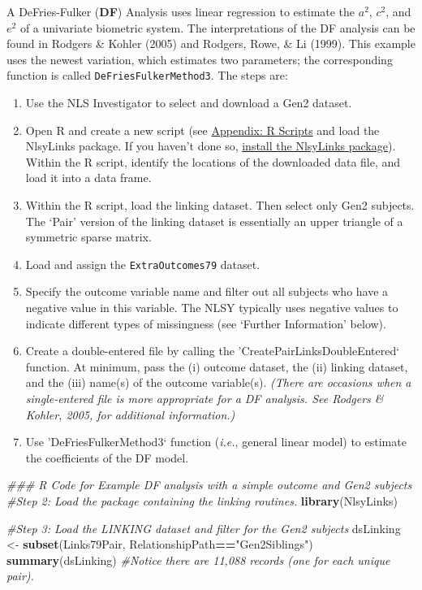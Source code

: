 \documentclass[smallextended]{svjour3}       %
\newenvironment{Shaded}{\begin{snugshade}}{\end{snugshade}}
\newcommand{\CommentTok}[1]{\textcolor[rgb]{0.56,0.35,0.01}{\textit{#1}}}
\newcommand{\KeywordTok}[1]{\textcolor[rgb]{0.13,0.29,0.53}{\textbf{#1}}}
\newcommand{\NormalTok}[1]{#1}
\newcommand{\OperatorTok}[1]{\textcolor[rgb]{0.81,0.36,0.00}{\textbf{#1}}}
\newcommand{\StringTok}[1]{\textcolor[rgb]{0.31,0.60,0.02}{#1}}
\begin{document}
A DeFries-Fulker (\textbf{DF}) Analysis uses linear regression to
estimate the \(a^2\), \(c^2\), and \(e^2\) of a univariate biometric
system. The interpretations of the DF analysis can be found in Rodgers
\& Kohler (2005) and Rodgers, Rowe, \& Li (1999). This example uses the
newest variation, which estimates two parameters; the corresponding
function is called \texttt{DeFriesFulkerMethod3}. The steps are:

\begin{enumerate}
\def\labelenumi{\arabic{enumi}.}
\item
  Use the NLS Investigator to select and download a Gen2 dataset.
\item
  Open R and create a new script (see
  \protect\hyperlink{appendix-creating-and-saving-r-scripts}{Appendix: R
  Scripts} and load the NlsyLinks package. If you haven't done so,
  \protect\hyperlink{appendix-installing-and-loading-the-nlsylinks-package}{install
  the NlsyLinks package}). Within the R script, identify the locations
  of the downloaded data file, and load it into a data frame.
\item
  Within the R script, load the linking dataset. Then select only Gen2
  subjects. The `Pair' version of the linking dataset is essentially an
  upper triangle of a symmetric sparse matrix.
\item
  Load and assign the \texttt{ExtraOutcomes79} dataset.
\item
  Specify the outcome variable name and filter out all subjects who have
  a negative value in this variable. The NLSY typically uses negative
  values to indicate different types of missingness (see `Further
  Information' below).
\item
  Create a double-entered file by calling the
  'CreatePairLinksDoubleEntered` function. At minimum, pass the (i)
  outcome dataset, the (ii) linking dataset, and the (iii) name(s) of
  the outcome variable(s). \emph{(There are occasions when a
  single-entered file is more appropriate for a DF analysis. See Rodgers
  \& Kohler, 2005, for additional information.)}
\item
  Use 'DeFriesFulkerMethod3` function (\emph{i.e.}, general linear
  model) to estimate the coefficients of the DF model.
\end{enumerate}

\begin{Shaded}
\begin{Highlighting}[]
\CommentTok{### R Code for Example DF analysis with a simple outcome and Gen2 subjects}
\CommentTok{#Step 2: Load the package containing the linking routines.}
\KeywordTok{library}\NormalTok{(NlsyLinks)}

\CommentTok{#Step 3: Load the LINKING dataset and filter for the Gen2 subjects}
\NormalTok{dsLinking <-}\StringTok{ }\KeywordTok{subset}\NormalTok{(Links79Pair, RelationshipPath}\OperatorTok{==}\StringTok{"Gen2Siblings"}\NormalTok{)}
\KeywordTok{summary}\NormalTok{(dsLinking) }\CommentTok{#Notice there are 11,088 records (one for each unique pair).}
\end{Highlighting}
\end{Shaded}
\end{document}

